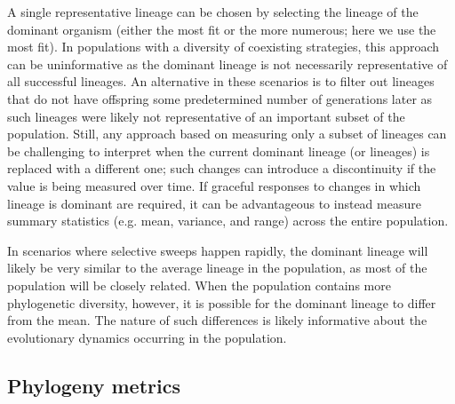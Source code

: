 \documentclass[letterpaper]{article}
\begin{document}
A single representative lineage can be chosen by selecting the lineage of the dominant organism (either the most fit or the more numerous; here we use the most fit). In populations with a diversity of coexisting strategies, this approach can be uninformative as the dominant lineage is not necessarily representative of all successful lineages. An alternative in these scenarios is to filter out lineages that do not have offspring some predetermined number of generations later as such lineages were likely not representative of an important subset of the population. Still, any approach based on measuring only a subset of lineages can be challenging to interpret when the current dominant lineage (or lineages) is replaced with a different one; such changes can introduce a discontinuity if the value is being measured over time. If graceful responses to changes in which lineage is dominant are required, it can be advantageous to instead measure summary statistics (e.g. mean, variance, and range) across the entire population. 

In scenarios where selective sweeps happen rapidly, the dominant lineage will likely be very similar to the average lineage in the population, as most of the population will be closely related. When the population contains more phylogenetic diversity, however, it is possible for the dominant lineage to differ from the mean. The nature of such differences is likely informative about the evolutionary dynamics occurring in the population. 

\subsection{Phylogeny metrics}
\end{document}
